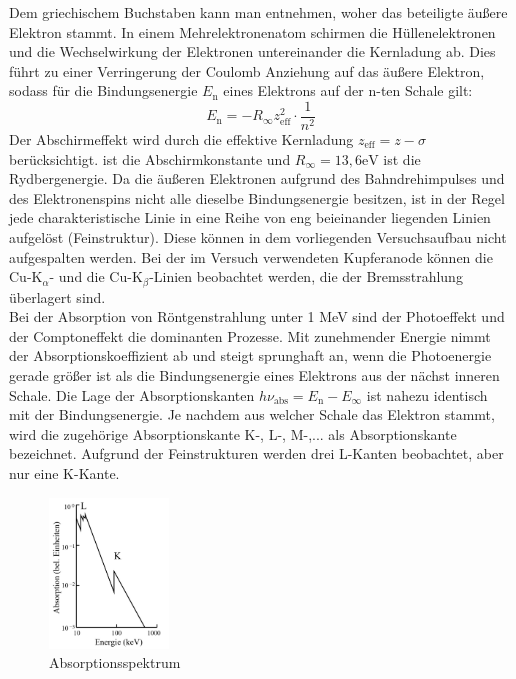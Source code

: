 Dem griechischem Buchstaben kann man entnehmen, woher das beteiligte äußere Elektron stammt.
In einem Mehrelektronenatom schirmen die Hüllenelektronen und die Wechselwirkung der Elektronen untereinander die Kernladung ab.
Dies führt zu einer Verringerung der Coulomb Anziehung auf das äußere Elektron, sodass für die Bindungsenergie $E_\text{n}$ eines Elektrons auf der n-ten Schale gilt:
\begin{equation}
    E_\text{n} = -R_{\infty}z_{\text{eff}}^2 \cdot \frac{1}{n^2}
    \label{eqn:gl2}
\end{equation}
Der Abschirmeffekt wird durch die effektive Kernladung $z_{\text{eff}} = z - \sigma$ berücksichtigt.
\sigma ist die Abschirmkonstante und $R_{\infty} = 13,6 \text{eV}$ ist die Rydbergenergie.
Da die äußeren Elektronen aufgrund des Bahndrehimpulses und des Elektronenspins nicht alle dieselbe Bindungsenergie besitzen, ist in der Regel jede charakteristische Linie in eine Reihe von eng beieinander liegenden Linien aufgelöst (Feinstruktur).
Diese können in dem vorliegenden Versuchsaufbau nicht aufgespalten werden.
Bei der im Versuch verwendeten Kupferanode können die $\text{Cu-K}_{\alpha}\text{- und die Cu-K}_{\beta}\text{-Linien}$ beobachtet werden, die der Bremsstrahlung überlagert sind.\\
\noindent
Bei der Absorption von Röntgenstrahlung unter 1 MeV sind der Photoeffekt und der Comptoneffekt die dominanten Prozesse.
Mit zunehmender Energie nimmt der Absorptionskoeffizient ab und steigt sprunghaft an, wenn die Photoenergie gerade größer ist als die Bindungsenergie eines Elektrons aus der nächst inneren Schale.
Die Lage der Absorptionskanten $h \nu_{\text{abs}} = E_{\text{n}} - E_{\infty}$ ist nahezu identisch mit der Bindungsenergie.
Je nachdem aus welcher Schale das Elektron stammt, wird die zugehörige Absorptionskante K-, L-, M-,... als Absorptionskante bezeichnet.
Aufgrund der Feinstrukturen werden drei L-Kanten beobachtet, aber nur eine K-Kante.
\begin{figure}
    \centering
    \includegraphics[height=4.0cm]{data/abb2.jpg}
    \caption{Absorptionsspektrum \cite{V602}}
    \label{fig:abb2}
\end{figure} \\

